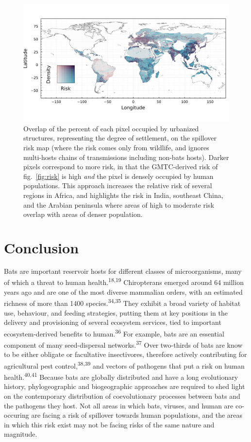 \documentclass[11pt]{article}
\makeatletter
\def\maxwidth{\ifdim\Gin@nat@width>\linewidth\linewidth
\else\Gin@nat@width\fi}
\let\Oldincludegraphics\includegraphics
\renewcommand{\includegraphics}[1]{\Oldincludegraphics[width=\maxwidth]{#1}}
\makeatother
\begin{document}
\begin{figure}
\hypertarget{fig:compound}{%
\centering
\includegraphics{figures/risk_compounded.png}
\caption{Overlap of the percent of each pixel occupied by urbanized
structures, representing the degree of settlement, on the spillover risk
map (where the risk comes only from wildlife, and ignores multi-hosts
chains of transmissions including non-bats hosts). Darker pixels
correspond to more risk, in that the GMTC-derived risk of
fig.~\ref{fig:risk} is high \emph{and} the pixel is densely occupied by
human populations. This approach increases the relative risk of several
regions in Africa, and highlights the risk in India, southeast China,
and the Arabian peninsula where areas of high to moderate risk overlap
with areas of denser population.}\label{fig:compound}
}
\end{figure}

\hypertarget{conclusion}{%
\section{Conclusion}\label{conclusion}}

Bats are important reservoir hosts for different classes of
microorganisms, many of which a threat to human
health.\textsuperscript{18,19} Chiropterans emerged around 64 million
years ago and are one of the most diverse mammalian orders, with an
estimated richness of more than 1400 species.\textsuperscript{34,35}
They exhibit a broad variety of habitat use, behaviour, and feeding
strategies, putting them at key positions in the delivery and
provisioning of several ecosystem services, tied to important
ecosystem-derived benefits to human.\textsuperscript{36} For example,
bats are an essential component of many seed-dispersal
networks.\textsuperscript{37} Over two-thirds of bats are know to be
either obligate or facultative insectivores, therefore actively
contributing for agricultural pest control,\textsuperscript{38,39} and
vectors of pathogens that put a risk on human
health.\textsuperscript{40,41} Because bats are globally distributed and
have a long evolutionary history, phylogeographic and biogeographic
approaches are required to shed light on the contemporary distribution
of coevolutionary processes between bats and the pathogens they host.
Not all areas in which bats, viruses, and human are co-occuring are
facing a risk of spillover towards human populations, and the areas in
which this risk exist may not be facing risks of the same nature and
magnitude.
\end{document}
